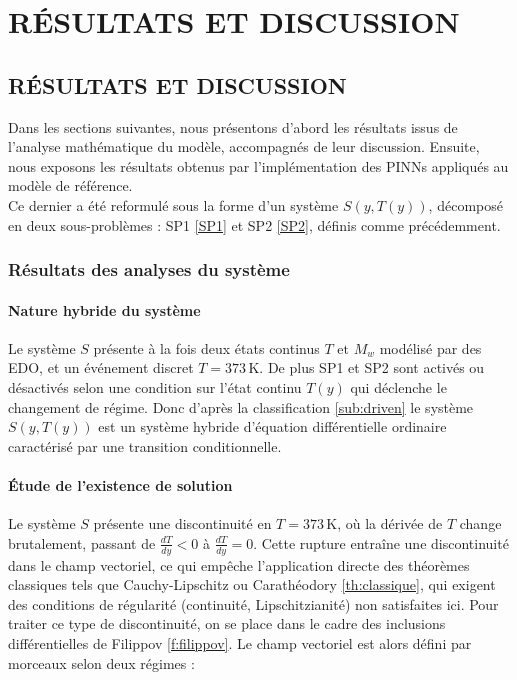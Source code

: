 \documentclass[12pt, oneside]{report} %
\theoremstyle{definition}
\theoremstyle{remark}
\begin{document}
		\part*{RÉSULTATS ET DISCUSSION}
		\chapter{RÉSULTATS ET DISCUSSION} 
		

Dans les sections suivantes, nous présentons d’abord les résultats issus de l’analyse mathématique du modèle, accompagnés de leur discussion.  
Ensuite, nous exposons les résultats obtenus par l’implémentation des PINNs appliqués au modèle de référence.\\
Ce dernier a été reformulé sous la forme d’un système $S(y, T(y))$, décomposé en deux sous-problèmes : SP1 \eqref{SP1} et SP2 \eqref{SP2}, définis comme précédemment.


\section{Résultats des analyses du système}
\subsection{Nature hybride du système}
Le système $S$ présente à la fois deux états continus $ T \text{ et } M_w $ modélisé par des EDO, et un événement discret $T = 373\, \mathrm{K}$. De plus SP1 et SP2 sont activés ou désactivés selon une condition sur l'état continu $T(y)$ qui déclenche le changement de régime. 
Donc d'après la classification \eqref{sub:driven} le système $S(y, T(y))$ est un système hybride d'équation différentielle ordinaire caractérisé par une transition conditionnelle.

\subsection{Étude de l'existence de solution}

Le système $S$ présente une discontinuité en $T = 373\,\mathrm{K}$, où la dérivée de $T$ change brutalement, passant de $\frac{dT}{dy} < 0$ à $\frac{dT}{dy} = 0$. Cette rupture entraîne une discontinuité dans le champ vectoriel, ce qui empêche l’application directe des théorèmes classiques tels que Cauchy-Lipschitz ou Carathéodory \eqref{th:classique}, qui exigent des conditions de régularité (continuité, Lipschitzianité) non satisfaites ici.
Pour traiter ce type de discontinuité, on se place dans le cadre des inclusions différentielles de Filippov  \eqref{f:filippov}. Le champ vectoriel est alors défini par morceaux selon deux régimes :
\end{document}
